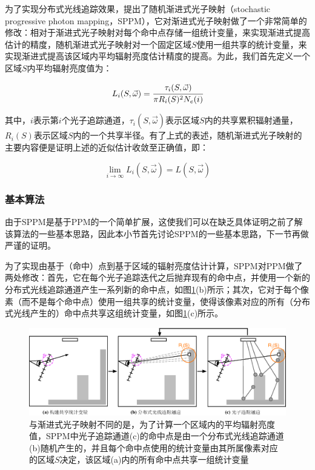 为了实现分布式光线追踪效果，\cite{a:StochasticProgressivePhotonMapping}提出了随机渐进式光子映射（stochastic progressive photon mapping，SPPM），它对渐进式光子映射做了一个非常简单的修改：相对于渐进式光子映射对每个命中点存储一组统计变量，来实现渐进式提高估计的精度，随机渐进式光子映射对一个固定区域$S$使用一组共享的统计变量，来实现渐进式提高该区域内平均辐射亮度估计精度的提高。为此，我们首先定义一个区域$S$内平均辐射亮度值为：

\begin{equation}
	L_i(S,\vec{\omega})= \cfrac{\tau_i(S,\vec{\omega})}{\pi R_i(S)^{2}N_e(i)}
\end{equation}

其中，$i$表示第$i$个光子追踪通道，$\tau_i(S,\vec{\omega})$表示区域$S$内的共享累积辐射通量，$R_i(S)$表示区域$S$内的一个共享半径。有了上式的表述，随机渐进式光子映射的主要内容便是证明上述的近似估计收敛至正确值，即：

\begin{equation}
	\lim_{i\to\infty}L_i(S,\vec{\omega})=L(S,\vec{\omega})
\end{equation}





\subsubsection{基本算法}
由于SPPM是基于PPM的一个简单扩展，这使我们可以在缺乏具体证明之前了解该算法的一些基本思路，因此本小节首先讨论SPPM的一些基本思路，下一节再做严谨的证明。

为了实现由基于（命中）点到基于区域的辐射亮度估计计算，SPPM对PPM做了两处修改：首先，它在每个光子追踪迭代之后抛弃现有的命中点，并使用一个新的分布式光线追踪通道产生一系列新的命中点，如图\ref{f:pm-stochastic-pmm}(b)所示；其次，它对于每个像素（而不是每个命中点）使用一组共享的统计变量，使得该像素对应的所有（分布式光线产生的）命中点共享这组统计变量，如图\ref{f:pm-stochastic-pmm}(c)所示。

\begin{figure}
\begin{fullwidth}
	\includegraphics[width=1.0\thewidth]{figures/pm/sppm}
	\caption{与渐进式光子映射不同的是，为了计算一个区域内的平均辐射亮度值，SPPM中光子追踪通道(c)的命中点是由一个分布式光线追踪通道(b)随机产生的，并且每个命中点使用的统计变量由其所属像素对应的区域$S$决定，该区域(a)内的所有命中点共享一组统计变量}
	\label{f:pm-stochastic-pmm}
\end{fullwidth}
\end{figure}

